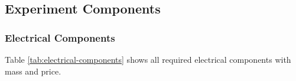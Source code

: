 \documentclass[a4paper,12pt,twoside]{article}
\providecommand{\DIFaddbegin}{} %
\providecommand{\DIFaddend}{} %
\newcommand{\DIFaddincludegraphics}[2][]{{\color{blue}\fbox{\DIFOincludegraphics[#1]{#2}}}} %
\DeclareRobustCommand{\DIFaddbegin}{\DIFOaddbegin \let\includegraphics\DIFaddincludegraphics} %
\DeclareRobustCommand{\DIFaddend}{\DIFOaddend \let\includegraphics\DIFOincludegraphics} %
\begin{document}
\raggedbottom
\begin{landscape}
\subsection{Experiment Components}
\subsubsection{Electrical Components}

Table \ref{tab:electrical-components} shows all required electrical components with mass and price.




\DIFaddbegin \begin{longtable}{|m{}|m{}|m{}|m{}|m{}|m{}|m{}|m{}|}
    \DIFaddend 


\end{longtable}
\end{landscape}
\end{document}
